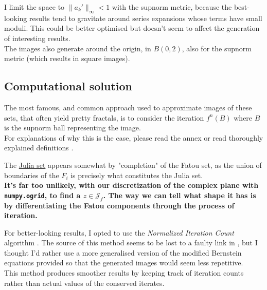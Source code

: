 \documentclass{article}
\begin{document}
I limit the space to $\lVert a_k' \rVert_{\infty} < 1$ with the supnorm metric, because the best-looking results tend to gravitate around series expansions whose terms have small moduli. This could be better optimised but doesn't seem to affect the generation of interesting results. \\
\vspace{2mm}
The images also generate around the origin, in $B(0,2)$, also for the supnorm metric (which results in square images). \\
\vspace{5mm}

\subsection{Computational solution}

The most famous, and common approach used to approximate images of these sets, that often yield pretty fractals, is to consider the iteration $f^n(B)$ where $B$ is the supnorm ball representing the image. \\
For explanations of why this is the case, please read the annex or read thoroughly explained definitions \cite{Sut14}. \\
\vspace{5mm}

The \underline{Julia set} appears somewhat by "completion" of the Fatou set, as the union of boundaries of the $F_i$ is precisely what constitutes the Julia set. \\
\vspace{5mm}
\textbf{It's far too unlikely, with our discretization of the complex plane with \texttt{numpy.ogrid}, to find a $z \in \mathcal{J}_f$. The way we can tell what shape it has is by differentiating the Fatou components through the process of iteration.} \\
\vspace{5mm}

For better-looking results, I opted to use the \textit{Normalized Iteration Count} algorithm \cite{Jon19}. The source of this method seems to be lost to a faulty link in \cite{Sil13}, but I thought I'd rather use a more generalised version of the modified Bernstein equations provided so that the generated images would seem less repetitive. \\
\vspace{2mm}
This method produces smoother results by keeping track of iteration counts rather than actual values of the conserved iterates. \\
\vspace{5mm}
\end{document}
